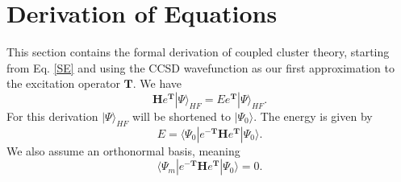 \documentclass[a4paper,norsk,11pt,twoside]{report}
\begin{document}
\section{Derivation of Equations}
This section contains the formal derivation of coupled cluster theory, starting from Eq. \eqref{SE} and using the CCSD wavefunction as our first approximation to the excitation operator $\textbf{T}$. 
We have
\begin{equation}
\textbf{H} e^{\textbf{T}} |\Psi \rangle_{HF} = E e^{\textbf{T}} |\Psi \rangle_{HF} .
\end{equation}
For this derivation $|\Psi \rangle_{HF}$ will be shortened to $|\Psi_0 \rangle$. The energy is given by
\begin{equation}
E = \langle \Psi_0 |e^{-\textbf{T}} \textbf{H} e^{\textbf{T}} |\Psi_0 \rangle .
\end{equation}
We also assume an orthonormal basis, meaning
\begin{equation}
\langle \Psi_m |e^{-\textbf{T}} \textbf{H} e^{\textbf{T}} |\Psi_0 \rangle = 0 .
\end{equation}
\end{document}
